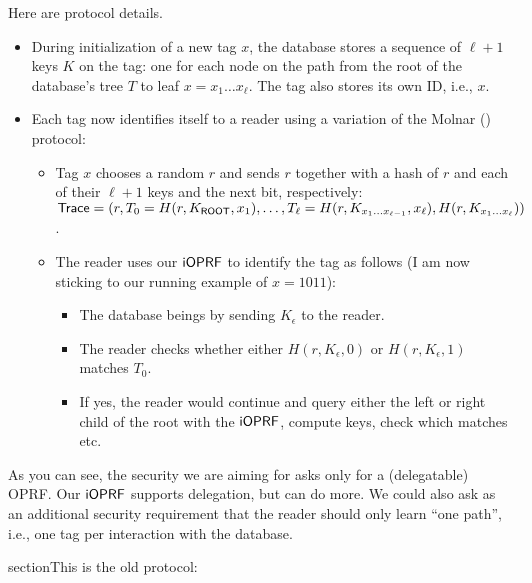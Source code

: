 Here are protocol details.
\begin{itemize}
  
\item During initialization of a new tag $x$, the database stores a
  sequence of $\ell+1$ keys $K$ on the tag: one for each node on the
  path from the root of the database's tree $T$ to leaf
  $x=x_1\ldots{}x_\ell$. The tag also stores its own ID, i.e., $x$.

\item Each tag now identifies itself to a reader using a variation of
  the Molnar () protocol:

  \begin{itemize}
  \item Tag $x$ chooses a random $r$ and sends $r$ together with a
    hash of $r$ and each of their $\ell+1$ keys and the next bit,
    respectively:
    $\mathsf{Trace}=(r,T_0=H(r,
    K_{\mathsf{ROOT}},x_1),\ldots,T_\ell=H(r,K_{x_1\ldots{}x_{\ell-1}},x_{\ell}),H(r,K_{x_1\ldots{}x_\ell}))$.

\item The reader uses our $\mathsf{i}\mathsf{OPRF}$ to identify the tag as follows (I am now sticking to our running example of $x=1011$):

 \begin{itemize}

 \item The database beings by sending $K_\epsilon$ to the reader.
   
  \item The reader checks whether either $H(r,K_\epsilon,0)$ or $H(r,K_\epsilon,1)$  matches
    $T_0$.

  \item If yes, the reader would continue and query either the left or
    right child of the root with the $\mathsf{i}\mathsf{OPRF}$, compute keys, check
    which matches etc.
\end{itemize}
  \end{itemize}
\end{itemize}

As you can see, the security we are aiming for asks only for a
(delegatable) OPRF. Our $\mathsf{i}\mathsf{OPRF}$ supports delegation, but can do more. We
could also ask as an additional security requirement that the reader
should only learn ``one path'', i.e., one tag per interaction with the
database. 


\newpage
section{This is the old protocol:}

